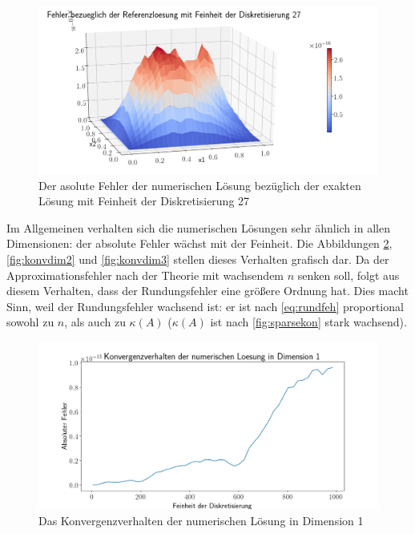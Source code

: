\documentclass[smallheadings]{scrartcl}
\numberwithin{equation}{section}
\begin{document}
\begin{figure}
	\centering
	\includegraphics[width=\linewidth]{Bericht/Bilder2/3dfeh27}
	\caption{Der asolute Fehler der numerischen Lösung bezüglich der exakten Lösung mit Feinheit der Diskretisierung 27}
	\label{fig:3dfel27}
\end{figure}

Im Allgemeinen verhalten sich die numerischen Lösungen sehr ähnlich in allen Dimensionen: der absolute Fehler wächst mit der Feinheit. Die Abbildungen \ref{fig:konvdim1}, \ref{fig:konvdim2} und \ref{fig:konvdim3} stellen dieses Verhalten grafisch dar. Da der Approximationsfehler nach der Theorie mit wachsendem $n$ senken soll, folgt aus diesem Verhalten, dass der Rundungsfehler eine größere Ordnung hat. Dies macht Sinn, weil der Rundungsfehler wachsend ist: er ist nach \ref{eq:rundfeh} proportional sowohl zu $n$, als auch zu $\kappa(A)$ ($\kappa(A)$ ist nach \ref{fig:sparsekon} stark wachsend).

\begin{figure}
	\centering
	\includegraphics[width=\linewidth]{Bericht/Bilder2/konvdim1}
	\caption{Das Konvergenzverhalten der numerischen Lösung in Dimension 1}
	\label{fig:konvdim1}
\end{figure}
\end{document}
